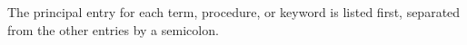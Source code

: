 \documentclass[twoside,twocolumn]{algol60}
\begin{document}
\vfill\eject

\renewcommand{\bibname}{References}



\vfill\eject

\begin{theindex}

The principal entry for each term, procedure, or keyword is listed
first, separated from the other entries by a semicolon.

\bigskip

\printindex
\end{theindex}
\end{document}
